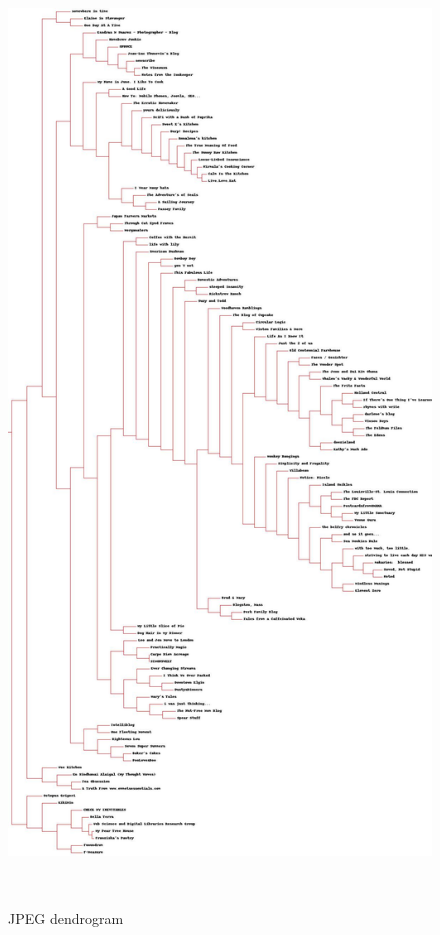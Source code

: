 \begin{figure}
\centering
\includegraphics[height=25cm]{../q2/blogdendro.jpg}
\caption{JPEG dendrogram}
\end{figure}







